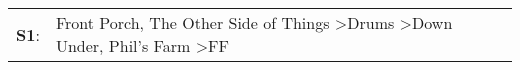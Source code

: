 \begin{supertabular}{p{0.03\textwidth}p{0.92\textwidth}}
 \textbf{S1}:  &  Front Porch\textsuperscript{}, \enspace The Other Side of Things\textsuperscript{} \textgreater \enspace Drums\textsuperscript{} \textgreater \enspace Down Under\textsuperscript{}, \enspace Phil's Farm\textsuperscript{} \textgreater \enspace FF\textsuperscript{}  \enspace  \\
\end{supertabular}
